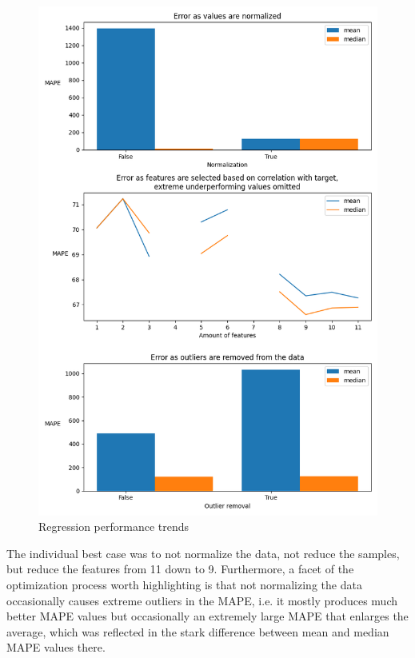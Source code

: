\documentclass[12pt, letterpaper]{article}
\begin{document}
\begin{figure}[H]
    \centering
    \includegraphics[scale=0.7]{regression_performance.png}
    \caption{Regression performance trends}
    \label{reg_plt} %
\end{figure}

The individual best case was to not normalize the data, not reduce the samples, but reduce the features from 11 down to 9. Furthermore, a facet of the optimization process worth highlighting is that not normalizing the data occasionally causes extreme outliers in the MAPE, i.e. it mostly produces much better MAPE values but occasionally an extremely large MAPE that enlarges the average, which was reflected in the stark difference between mean and median MAPE values there.
\end{document}

